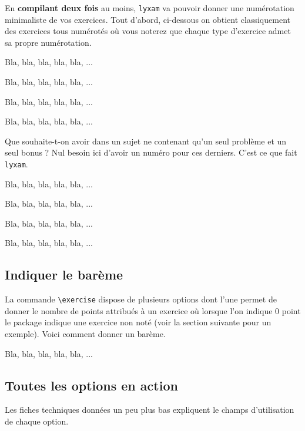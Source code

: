 \documentclass[12pt,a4paper]{scrartcl}
\makeatletter
\theoremstyle{definition}
\newcommand\resetallcnt{
		\setcounter{lyxam@counter@topic}{0}
		\setcounter{lyxam@counter@exercise}{0}
		\setcounter{lyxam@counter@problem}{0}
		\setcounter{lyxam@counter@bonus}{0}
		\setcounter{lyxam@counter@subpart}{0}
	}
\makeatother
\begin{document}
En \textbf{compilant deux fois} au moins, \verb+lyxam+ va pouvoir donner une numérotation minimaliste de vos exercices. Tout d'abord, ci-dessous on obtient classiquement des exercices tous numérotés où vous noterez que chaque type d'exercice admet sa propre numérotation.


\begin{tcblisting}{}
\exercise
Bla, bla, bla, bla, bla, ...

\exercise
Bla, bla, bla, bla, bla, ...

\problem
Bla, bla, bla, bla, bla, ...

\problem
Bla, bla, bla, bla, bla, ...
\end{tcblisting}


Que souhaite-t-on avoir dans un sujet ne contenant qu'un seul problème et un seul bonus ? Nul besoin ici d'avoir un numéro pour ces derniers. C'est ce que fait \verb+lyxam+.

\resetallcnt{}

\begin{tcblisting}{}
\exercise
Bla, bla, bla, bla, bla, ...

\exercise
Bla, bla, bla, bla, bla, ...

\problem
Bla, bla, bla, bla, bla, ...

\bonus
Bla, bla, bla, bla, bla, ...
\end{tcblisting}



    \subsection{Indiquer le barème}

La commande \verb+\exercise+ dispose de plusieurs options dont l'une permet de donner le nombre de points attribués à un exercice où lorsque l'on indique $0$ point le package indique une exercice non noté (voir la section suivante pour un exemple). Voici comment donner un barème.

\resetallcnt{}

\begin{tcblisting}{}
\exercise[pts = 5]
Bla, bla, bla, bla, bla, ...
\end{tcblisting}


    \subsection{Toutes les options en action}

Les fiches techniques données un peu plus bas expliquent le champs d'utilisation de chaque option.
\end{document}
